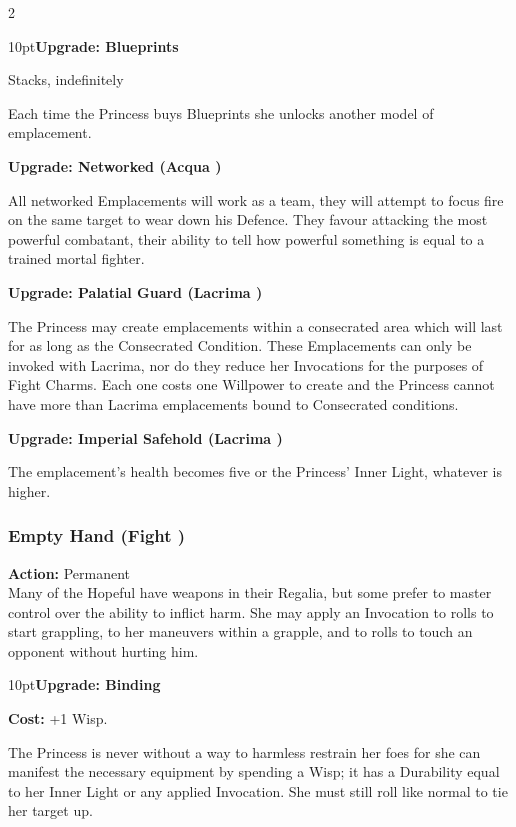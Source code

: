 \begin{multicols}{2}
 \begin{myindentpar}{10pt}\textbf{Upgrade: Blueprints}

Stacks, indefinitely

Each time the Princess buys Blueprints she unlocks another model of emplacement. 

\textbf{Upgrade: Networked (Acqua \textbullet\textbullet)}

All networked Emplacements will work as a team, they will attempt to focus fire on the same target to wear down his Defence. They favour attacking the most powerful combatant, their ability to tell how powerful something is equal to a trained mortal fighter. 

\textbf{Upgrade: Palatial Guard (Lacrima \textbullet\textbullet)}

The Princess may create emplacements within a consecrated area which will last for as long as the Consecrated Condition. These Emplacements can only be invoked with Lacrima, nor do they reduce her Invocations for the purposes of Fight Charms. Each one costs one Willpower to create and the Princess cannot have more than Lacrima emplacements bound to Consecrated conditions. 

\textbf{Upgrade: Imperial Safehold (Lacrima \textbullet\textbullet)}

The emplacement's health becomes five or the Princess' Inner Light, whatever is higher. 

\end{myindentpar}

\subsubsection*{Empty Hand (Fight \textbullet)}

\noindent \textbf{Action:} Permanent \\

\noindent Many of the Hopeful have weapons in their Regalia, but some prefer to master control over the ability to inflict harm. She may apply an Invocation to rolls to start grappling, to her maneuvers within a grapple, and to rolls to touch an opponent without hurting him.

\begin{myindentpar}{10pt}\textbf{Upgrade: Binding}

\textbf{Cost:} +1 Wisp. 

The Princess is never without a way to harmless restrain her foes for she can manifest the necessary equipment by spending a Wisp; it has a Durability equal to her Inner Light or any applied Invocation. She must still roll like normal to tie her target up. 


\end{myindentpar}
\end{multicols}
